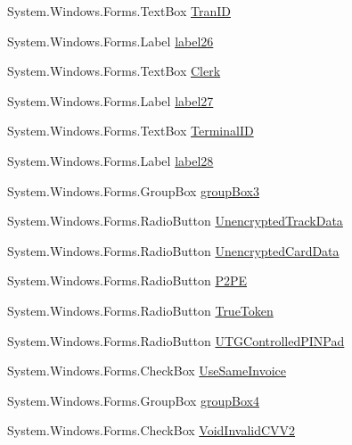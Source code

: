 \begin{DoxyCompactItemize}
System.\+Windows.\+Forms.\+Text\+Box \mbox{\hyperlink{class_form_sim_1_1_form1_a5b6c7bb34019bd75dac9c0c66849525c}{Tran\+ID}}
\item 
System.\+Windows.\+Forms.\+Label \mbox{\hyperlink{class_form_sim_1_1_form1_ad5910926bf8163bd586357327489fe97}{label26}}
\item 
System.\+Windows.\+Forms.\+Text\+Box \mbox{\hyperlink{class_form_sim_1_1_form1_a3467b3663809dc0058c06d4096195112}{Clerk}}
\item 
System.\+Windows.\+Forms.\+Label \mbox{\hyperlink{class_form_sim_1_1_form1_a79b7b1071294d3869f770027d2320995}{label27}}
\item 
System.\+Windows.\+Forms.\+Text\+Box \mbox{\hyperlink{class_form_sim_1_1_form1_a42e8c436f14385be46b7f8709842117b}{Terminal\+ID}}
\item 
System.\+Windows.\+Forms.\+Label \mbox{\hyperlink{class_form_sim_1_1_form1_a8ff3803f9d5326ff15be24c1ad63a26f}{label28}}
\item 
System.\+Windows.\+Forms.\+Group\+Box \mbox{\hyperlink{class_form_sim_1_1_form1_a5720ca856fb2951f607711dddb7d2c2c}{group\+Box3}}
\item 
System.\+Windows.\+Forms.\+Radio\+Button \mbox{\hyperlink{class_form_sim_1_1_form1_a11c72e62d927380d3886dc30a9bbccb5}{Unencrypted\+Track\+Data}}
\item 
System.\+Windows.\+Forms.\+Radio\+Button \mbox{\hyperlink{class_form_sim_1_1_form1_ae28b45eefe4dba9ab1e6a68aad9b69c5}{Unencrypted\+Card\+Data}}
\item 
System.\+Windows.\+Forms.\+Radio\+Button \mbox{\hyperlink{class_form_sim_1_1_form1_a487cd7322b02504424c07b0b0ed3d1c9}{P2\+PE}}
\item 
System.\+Windows.\+Forms.\+Radio\+Button \mbox{\hyperlink{class_form_sim_1_1_form1_ad2f26b2aa7f2d698ff06a10286b1f653}{True\+Token}}
\item 
System.\+Windows.\+Forms.\+Radio\+Button \mbox{\hyperlink{class_form_sim_1_1_form1_ac2750ba08d5ff215e33cbfbacd6c370d}{U\+T\+G\+Controlled\+P\+I\+N\+Pad}}
\item 
System.\+Windows.\+Forms.\+Check\+Box \mbox{\hyperlink{class_form_sim_1_1_form1_a22568fda606ce041b35f4a485b896edb}{Use\+Same\+Invoice}}
\item 
System.\+Windows.\+Forms.\+Group\+Box \mbox{\hyperlink{class_form_sim_1_1_form1_a1f197afbba156a1cd26e83d11b97d391}{group\+Box4}}
\item 
System.\+Windows.\+Forms.\+Check\+Box \mbox{\hyperlink{class_form_sim_1_1_form1_ae1cc93ed604fda928b9751fecf1d4873}{Void\+Invalid\+C\+V\+V2}}

\end{DoxyCompactItemize}
